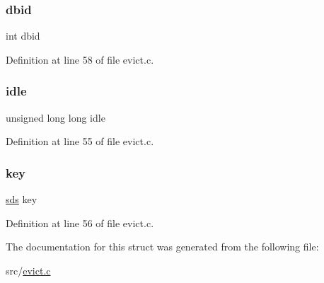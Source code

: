 \mbox{\label{structeviction_pool_entry_adc62368127157e2b3ff9cabe77f4f337}} 
\subsubsection{\texorpdfstring{dbid}{dbid}}
{\footnotesize\ttfamily int dbid}



Definition at line 58 of file evict.\+c.

\mbox{\label{structeviction_pool_entry_a33e435ed79bd42a3e152e820d2fe9c59}} 
\subsubsection{\texorpdfstring{idle}{idle}}
{\footnotesize\ttfamily unsigned long long idle}



Definition at line 55 of file evict.\+c.

\mbox{\label{structeviction_pool_entry_a46666a67588d8b58e5f36934ee61ea81}} 
\subsubsection{\texorpdfstring{key}{key}}
{\footnotesize\ttfamily \hyperlink{sds_8h_ad69abac3df4532879db9642c95f5ef6f}{sds} key}



Definition at line 56 of file evict.\+c.



The documentation for this struct was generated from the following file\+:\begin{DoxyCompactItemize}
\item 
src/\hyperlink{evict_8c}{evict.\+c}\end{DoxyCompactItemize}

